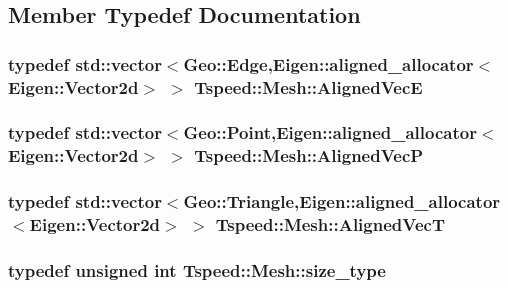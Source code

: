 \subsection{Member Typedef Documentation}
\hypertarget{classTspeed_1_1Mesh_a09031b0dab0f2efcef61981dfc9d1640}{
\subsubsection[{Aligned\-Vec\-E}]{\setlength{\rightskip}{0pt plus 5cm}typedef std\-::vector$<${\bf Geo\-::\-Edge},Eigen\-::aligned\-\_\-allocator$<$Eigen\-::\-Vector2d$>$ $>$ {\bf Tspeed\-::\-Mesh\-::\-Aligned\-Vec\-E}}}\label{classTspeed_1_1Mesh_a09031b0dab0f2efcef61981dfc9d1640}
\hypertarget{classTspeed_1_1Mesh_aa8aac31131166087d192ef77c49fb5b2}{
\subsubsection[{Aligned\-Vec\-P}]{\setlength{\rightskip}{0pt plus 5cm}typedef std\-::vector$<${\bf Geo\-::\-Point},Eigen\-::aligned\-\_\-allocator$<$Eigen\-::\-Vector2d$>$ $>$ {\bf Tspeed\-::\-Mesh\-::\-Aligned\-Vec\-P}}}\label{classTspeed_1_1Mesh_aa8aac31131166087d192ef77c49fb5b2}
\hypertarget{classTspeed_1_1Mesh_ae62a59eea301689dd9f7c9663414db18}{
\subsubsection[{Aligned\-Vec\-T}]{\setlength{\rightskip}{0pt plus 5cm}typedef std\-::vector$<${\bf Geo\-::\-Triangle},Eigen\-::aligned\-\_\-allocator$<$Eigen\-::\-Vector2d$>$ $>$ {\bf Tspeed\-::\-Mesh\-::\-Aligned\-Vec\-T}}}\label{classTspeed_1_1Mesh_ae62a59eea301689dd9f7c9663414db18}
\hypertarget{classTspeed_1_1Mesh_a097181c50faa6c8cec5dbe135694606b}{
\subsubsection[{size\-\_\-type}]{\setlength{\rightskip}{0pt plus 5cm}typedef unsigned int {\bf Tspeed\-::\-Mesh\-::size\-\_\-type}}}\label{classTspeed_1_1Mesh_a097181c50faa6c8cec5dbe135694606b}


